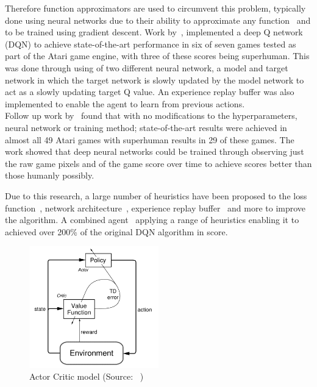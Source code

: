 Therefore function approximators are used to circumvent this problem, typically done using neural networks due to their
ability to approximate any function~\citep{csaji2001approximation} and to be trained using gradient descent.
Work by~\cite{atari}, implemented a deep Q network (DQN) to achieve state-of-the-art performance in six
of seven games tested as part of the Atari game engine, with three of these scores being superhuman. This was done
through using of two different neural network, a model and target network in which the target network is slowly
updated by the model network to act as a slowly updating target Q value. An experience replay buffer was also
implemented to enable the agent to learn from previous actions. \\
Follow up work by~\cite{mnih2015humanlevel} found that with no modifications to the hyperparameters, neural network or
training method; state-of-the-art results were achieved in almost all 49 Atari games with superhuman results in 29 of
these games. The work showed that deep neural networks could be trained through observing just the raw game pixels and
of the game score over time to achieve scores better than those humanly possibly.

Due to this research, a large number of heuristics have been proposed to the loss function~\citep{doubledqn},
network architecture~\citep{duelingdqn}, experience replay buffer~\citep{prioritizedexperiencereplay} and more to
improve the algorithm. A combined agent~\citep{rainbow} applying a range of heuristics enabling it to
achieved over 200\% of the original DQN algorithm in score.

\begin{figure}
    \includegraphics[width=0.5\textwidth]{figures/2_background_lit_figs/actor-critic.png}
    \caption{Actor Critic model (Source: ~\cite{Sutton1998})}
    \label{fig:actor-critic-model}
\end{figure}

